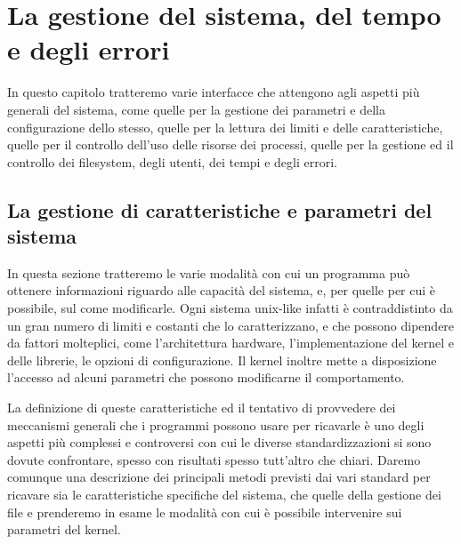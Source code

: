 
\chapter{La gestione del sistema, del tempo e degli errori}
\label{cha:system}

In questo capitolo tratteremo varie interfacce che attengono agli aspetti più
generali del sistema, come quelle per la gestione dei parametri e della
configurazione dello stesso, quelle per la lettura dei limiti e delle
caratteristiche, quelle per il controllo dell'uso delle risorse dei processi,
quelle per la gestione ed il controllo dei filesystem, degli utenti, dei tempi
e degli errori.


\section{La gestione di caratteristiche e parametri del sistema}
\label{sec:sys_characteristics}

In questa sezione tratteremo le varie modalità con cui un programma può
ottenere informazioni riguardo alle capacità del sistema, e, per quelle per
cui è possibile, sul come modificarle. Ogni sistema unix-like infatti è
contraddistinto da un gran numero di limiti e costanti che lo caratterizzano,
e che possono dipendere da fattori molteplici, come l'architettura hardware,
l'implementazione del kernel e delle librerie, le opzioni di
configurazione. Il kernel inoltre mette a disposizione l'accesso ad alcuni
parametri che possono modificarne il comportamento.

La definizione di queste caratteristiche ed il tentativo di provvedere dei
meccanismi generali che i programmi possono usare per ricavarle è uno degli
aspetti più complessi e controversi con cui le diverse standardizzazioni si
sono dovute confrontare, spesso con risultati spesso tutt'altro che chiari.
Daremo comunque una descrizione dei principali metodi previsti dai vari
standard per ricavare sia le caratteristiche specifiche del sistema, che
quelle della gestione dei file e prenderemo in esame le modalità con cui è
possibile intervenire sui parametri del kernel.


